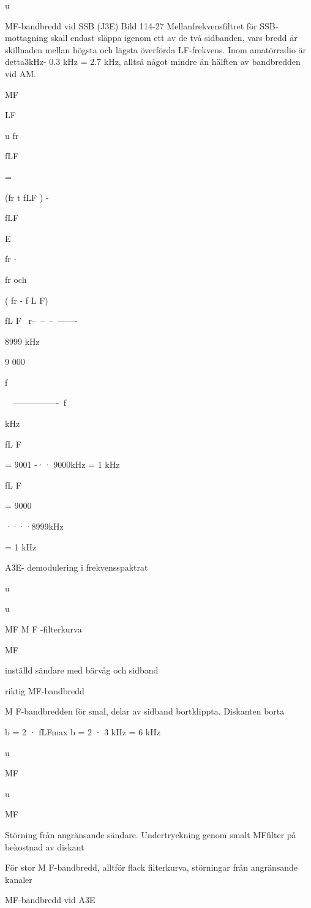 u

MF-bandbredd vid SSB (J3E)
Bild 114-27
Mellanfrekvensfiltret för SSB-mottagning
skall endast släppa igenom ett av de två
sidbanden, vars bredd är skillnaden mellan
högsta och lägsta överförda LF-frekvens.
Inom amatörradio är detta3kHz- 0.3 kHz =
2.7 kHz, alltså något mindre än hälften av
bandbredden vid AM.

MF

LF

u
fr

fLF

=

(fr t fLF ) -

fLF

E

fr -

fr och

( fr - f L F)

fL F
~r--~--~--~-------

8999
kHz

9 000

f

~~----------------~f

kHz

fL F

= 9001 -·· 9000kHz = 1 kHz

fL F

= 9000

····8999kHz

= 1 kHz

A3E- demodulering i frekvensspaktrat

u

u

MF
M F -filterkurva

MF

inställd sändare
med bärvåg och sidband

riktig MF-bandbredd

M F-bandbredden för smal, delar av
sidband bortklippta. Diskanten borta

b = 2 · fLFmax
b = 2 · 3 kHz = 6 kHz

u

MF

u

MF

Störning från angränsande sändare.
Undertryckning genom smalt MFfilter på bekostnad av diskant

För stor M F-bandbredd, alltför
flack filterkurva, störningar från
angränsande kanaler

MF-bandbredd vid A3E


